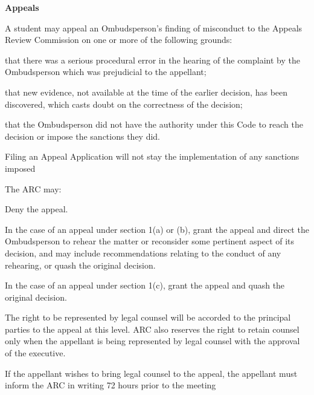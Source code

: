 \begin{longenum}[ label*=\arabic*., align=left]
\begin{longenum}[ label*=\arabic*., align=left]
       \end{longenum}
\item \textbf{Appeals}             
     \begin{longenum}[ label*=\arabic*., align=left]
		\item A  student  may  appeal  an  Ombudsperson's  finding  of  misconduct  to  the  Appeals  Review Commission on one or more of the following grounds:
		\begin{longenum}[ label*=\arabic*., align=left]
			\item that  there  was  a  serious  procedural  error  in  the  hearing  of  the  complaint  by  the Ombudsperson which was prejudicial to the appellant;
			\item that  new  evidence,  not  available  at  the  time  of  the  earlier  decision,  has  been discovered, which casts doubt on the correctness of the decision;
			\item that  the  Ombudsperson  did  not  have  the  authority  under  this  Code  to  reach  the decision or impose the sanctions they did.
            
      \end{longenum}

	\item Filing an Appeal Application will not stay the implementation of any sanctions imposed
    \item The ARC may:
		\begin{longenum}[ label*=\arabic*., align=left]
        \item Deny the appeal.
		\item In  the  case  of  an  appeal  under  section  1(a)  or  (b),  grant  the  appeal  and  direct  the Ombudsperson to rehear the matter or reconsider some pertinent aspect of its decision, and may include recommendations relating to the conduct of any rehearing, or quash the original decision.
		\item In the case of an appeal under section 1(c), grant the appeal and quash the original decision.
      \end{longenum}
	\item The  right  to  be  represented  by  legal  counsel  will  be  accorded  to  the  principal  parties  to  the appeal at this level. ARC also reserves the right to retain counsel only when the appellant is being represented by legal counsel with the approval of the executive.
    \begin{longenum}[ label*=\arabic*., align=left]
			\item If the appellant wishes to bring legal counsel to the appeal, the appellant must inform 
the ARC in writing 72 hours prior to the meeting


\end{longenum}
\end{longenum}
\end{longenum}
